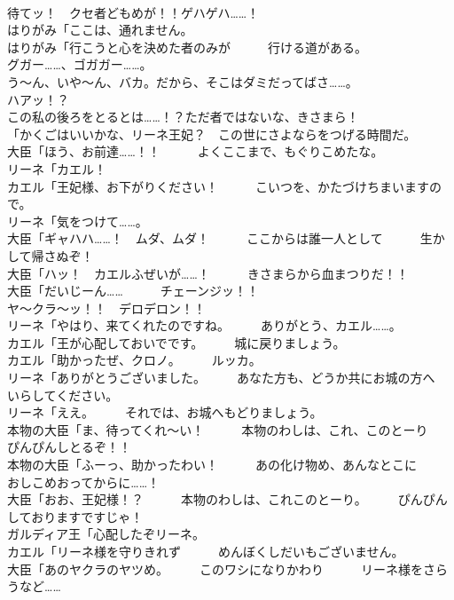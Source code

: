 \documentclass[8pt]{extreport}
\begin{document}
\begin{CJK}{UTF8}{min}
\\	待てッ！　クセ者どもめが！！ゲハゲハ……！	
\\	はりがみ「ここは、通れません。	
\\	はりがみ「行こうと心を決めた者のみが　　　行ける道がある。	
\\	グガー……、ゴガガー……。	
\\	う～ん、いや～ん、バカ。だから、そこはダミだってばさ……。	
\\	ハアッ！？	
\\	この私の後ろをとるとは……！？ただ者ではないな、きさまら！	
\\	「かくごはいいかな、リーネ王妃？　この世にさよならをつげる時間だ。	
\\	大臣「ほう、お前達……！！　　　よくここまで、もぐりこめたな。	
\\	リーネ「カエル！	
\\	カエル「王妃様、お下がりください！　　　こいつを、かたづけちまいますので。	
\\	リーネ「気をつけて……。	
\\	大臣「ギャハハ……！　ムダ、ムダ！　　　ここからは誰一人として　　　生かして帰さぬぞ！	
\\	大臣「ハッ！　カエルふぜいが……！　　　きさまらから血まつりだ！！	
\\	大臣「だいじーん……　　　チェーンジッ！！	
\\	ヤ～クラ～ッ！！　デロデロン！！	
\\	リーネ「やはり、来てくれたのですね。　　　ありがとう、カエル……。	
\\	カエル「王が心配しておいでです。　　　城に戻りましょう。	
\\	カエル「助かったぜ、クロノ。　　　ルッカ。	
\\	リーネ「ありがとうございました。　　　あなた方も、どうか共にお城の方へ　　　いらしてください。	
\\	リーネ「ええ。　　　それでは、お城へもどりましょう。	
\\	本物の大臣「ま、待ってくれ～い！　　　本物のわしは、これ、このとーり　　　ぴんぴんしとるぞ！！	
\\	本物の大臣「ふーっ、助かったわい！　　　あの化け物め、あんなとこに　　　おしこめおってからに……！	
\\	大臣「おお、王妃様！？　　　本物のわしは、これこのとーり。　　　ぴんぴんしておりますですじゃ！	
\\	ガルディア王「心配したぞリーネ。	
\\	カエル「リーネ様を守りきれず　　　めんぼくしだいもございません。	
\\	大臣「あのヤクラのヤツめ。　　　このワシになりかわり　　　リーネ様をさらうなど……	

\end{CJK}
\end{document}
